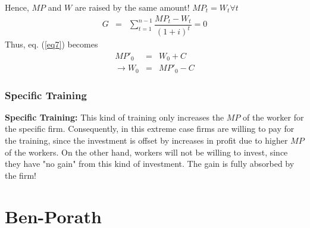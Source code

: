 \documentclass[12pt,a4paper]{article}
\begin{document}
  Hence, $MP$ and $W$ are raised by the same amount! $MP_t = W_t
  \forall t$ 
  \begin{eqnarray}
    G&=& \sum_{t=1}^{n-1} \dfrac{MP_t - W_t}{(1+i)^{t}}=0
  \end{eqnarray}
  Thus, eq. (\ref{eq7}) becomes 
  \begin{eqnarray}
    MP'_0 &=& W_0 +C \\
    \rightarrow W_0 &=& MP'_0 -C
  \end{eqnarray}
  \subsubsection{Specific Training} %
  \label{sub:Specific_Training}
  \textbf{Specific Training:} This kind of training only increases the
  $MP$ of the worker for the specific firm.
  Consequently, in this extreme case firms are willing to pay for the
  training, since the investment is offset by increases in profit due
  to higher $MP$ of the workers. On the other hand, workers will not
  be willing to invest, since they have "no gain" from this kind of
  investment. The gain is fully absorbed by the firm!

  \section{Ben-Porath} %
\end{document}
